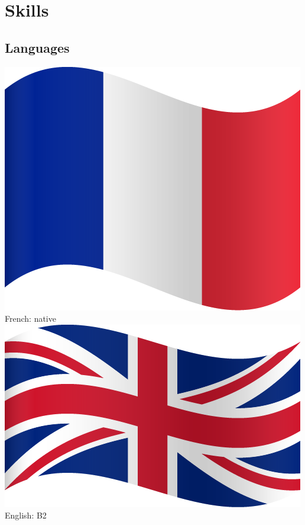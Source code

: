 \documentclass[]{deedy-resume-openfont}
\begin{document}
\begin{minipage}[t]{0.35\textwidth}

\section{Skills}
\subsection{Languages}
\includegraphics[scale=0.015]{images/france.png}  French: native \textbullet{}
\includegraphics[scale=0.015]{images/uk.png}  English: B2 \\

\end{minipage}
\end{document}
